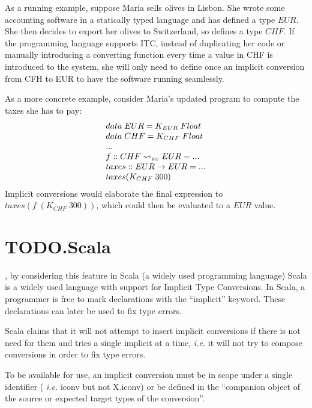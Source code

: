  As a running example, suppose Maria sells olives in Lisbon. She wrote some accounting software in a statically typed language and has defined a type $EUR$. She then decides to export her olives to Switzerland, so defines a type $CHF$. If the programming language supports ITC, instead of duplicating her code or manually introducing a converting function every time a value in CHF is introduced to the system, she will only need to define once an implicit conversion from CFH to EUR to have the software running seamlessly.

As a more concrete example, consider Maria's updated program to compute the taxes she has to pay:
     \[
\begin{array}{@{\hspace{0mm}}l@{\hspace{0mm}}}
data\;EUR=K_{EUR}\;Float\\
data\;CHF=K_{CHF}\;Float\\
...\\
f:: CHF \rightsquigarrow_{ax} EUR = ... \\
taxes :: EUR \to EUR = ...\\
taxes (K_{CHF} \; 300)
\end{array}
\]
 Implicit conversions would elaborate the final expression to $taxes (f\;(K_{CHF} \; 300))$, which could then be evaluated to a $EUR$ value.

\section{TODO.Scala}
\label{scala}
, by considering this feature in Scala (a widely used programming language)
Scala is a widely used language with support for Implicit Type Conversions. In Scala, a programmer is free to mark declarations with the ``implicit'' keyword. These declarations can later be used to fix type errors.

Scala claims that it will not attempt to insert implicit conversions if there is not need for them and tries a single implicit at a time, \textit{i.e.} it will not try to compose conversions in order to fix type errors.

To be available for use, an implicit conversion must be in scope under a single identifier (\textit{ i.e.} iconv but not X.iconv) or be defined in the ``companion object of  the source or expected target types of the conversion''.

